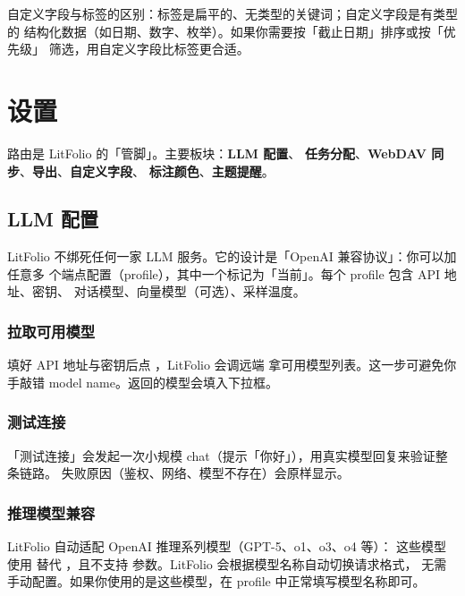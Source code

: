 \begin{tipbox}
自定义字段与标签的区别：标签是扁平的、无类型的关键词；自定义字段是有类型的
结构化数据（如日期、数字、枚举）。如果你需要按「截止日期」排序或按「优先级」
筛选，用自定义字段比标签更合适。
\end{tipbox}

\chapter{设置}
\label{ch:settings}

 路由是 LitFolio 的「管脚」。主要板块：\textbf{LLM 配置}、
\textbf{任务分配}、\textbf{WebDAV 同步}、\textbf{导出}、\textbf{自定义字段}、
\textbf{标注颜色}、\textbf{主题提醒}。

\section{LLM 配置}

LitFolio 不绑死任何一家 LLM 服务。它的设计是「OpenAI 兼容协议」：你可以加任意多
个端点配置（profile），其中一个标记为「当前」。每个 profile 包含 API 地址、密钥、
对话模型、向量模型（可选）、采样温度。


\subsection{拉取可用模型}

填好 API 地址与密钥后点 ，LitFolio 会调远端 
拿可用模型列表。这一步可避免你手敲错 model name。返回的模型会填入下拉框。

\subsection{测试连接}

「测试连接」会发起一次小规模 chat（提示「你好」），用真实模型回复来验证整条链路。
失败原因（鉴权、网络、模型不存在）会原样显示。

\subsection{推理模型兼容}

LitFolio 自动适配 OpenAI 推理系列模型（GPT-5、o1、o3、o4 等）：
这些模型使用  替代 ，且不支持
 参数。LitFolio 会根据模型名称自动切换请求格式，
无需手动配置。如果你使用的是这些模型，在 profile 中正常填写模型名称即可。


